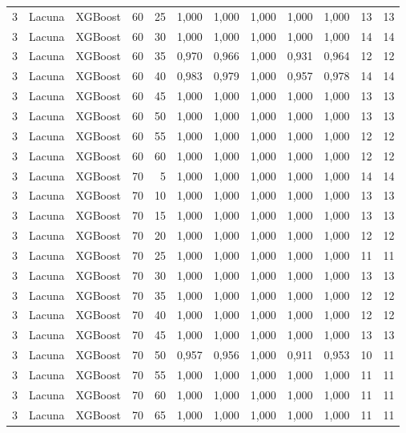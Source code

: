 \begin{longtable}{ccclrrrrrrrr}
3 & Lacuna & XGBoost & 60 & 25 & 1,000 & 1,000 & 1,000 & 1,000 & 1,000 & 13 & 13 \\
3 & Lacuna & XGBoost & 60 & 30 & 1,000 & 1,000 & 1,000 & 1,000 & 1,000 & 14 & 14 \\
3 & Lacuna & XGBoost & 60 & 35 & 0,970 & 0,966 & 1,000 & 0,931 & 0,964 & 12 & 12 \\
3 & Lacuna & XGBoost & 60 & 40 & 0,983 & 0,979 & 1,000 & 0,957 & 0,978 & 14 & 14 \\
3 & Lacuna & XGBoost & 60 & 45 & 1,000 & 1,000 & 1,000 & 1,000 & 1,000 & 13 & 13 \\
3 & Lacuna & XGBoost & 60 & 50 & 1,000 & 1,000 & 1,000 & 1,000 & 1,000 & 13 & 13 \\
3 & Lacuna & XGBoost & 60 & 55 & 1,000 & 1,000 & 1,000 & 1,000 & 1,000 & 12 & 12 \\
3 & Lacuna & XGBoost & 60 & 60 & 1,000 & 1,000 & 1,000 & 1,000 & 1,000 & 12 & 12 \\
3 & Lacuna & XGBoost & 70 & 5 & 1,000 & 1,000 & 1,000 & 1,000 & 1,000 & 14 & 14 \\
3 & Lacuna & XGBoost & 70 & 10 & 1,000 & 1,000 & 1,000 & 1,000 & 1,000 & 13 & 13 \\
3 & Lacuna & XGBoost & 70 & 15 & 1,000 & 1,000 & 1,000 & 1,000 & 1,000 & 13 & 13 \\
3 & Lacuna & XGBoost & 70 & 20 & 1,000 & 1,000 & 1,000 & 1,000 & 1,000 & 12 & 12 \\
3 & Lacuna & XGBoost & 70 & 25 & 1,000 & 1,000 & 1,000 & 1,000 & 1,000 & 11 & 11 \\
3 & Lacuna & XGBoost & 70 & 30 & 1,000 & 1,000 & 1,000 & 1,000 & 1,000 & 13 & 13 \\
3 & Lacuna & XGBoost & 70 & 35 & 1,000 & 1,000 & 1,000 & 1,000 & 1,000 & 12 & 12 \\
3 & Lacuna & XGBoost & 70 & 40 & 1,000 & 1,000 & 1,000 & 1,000 & 1,000 & 12 & 12 \\
3 & Lacuna & XGBoost & 70 & 45 & 1,000 & 1,000 & 1,000 & 1,000 & 1,000 & 13 & 13 \\
3 & Lacuna & XGBoost & 70 & 50 & 0,957 & 0,956 & 1,000 & 0,911 & 0,953 & 10 & 11 \\
3 & Lacuna & XGBoost & 70 & 55 & 1,000 & 1,000 & 1,000 & 1,000 & 1,000 & 11 & 11 \\
3 & Lacuna & XGBoost & 70 & 60 & 1,000 & 1,000 & 1,000 & 1,000 & 1,000 & 11 & 11 \\
3 & Lacuna & XGBoost & 70 & 65 & 1,000 & 1,000 & 1,000 & 1,000 & 1,000 & 11 & 11 \\

\end{longtable}
